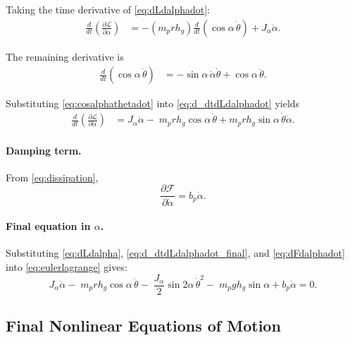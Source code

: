 \documentclass[12pt,a4paper]{article}
\begin{document}
Taking the time derivative of \eqref{eq:dLdalphadot}:
\begin{align}
\frac{d}{dt}\left(\frac{\partial\mathcal{L}}{\partial\dot\alpha}\right)
&=
-\left(m_p r h_g\right)\frac{d}{dt}\left(\cos\alpha\,\dot\theta\right)
+J_\alpha\ddot\alpha.
\label{eq:d_dtdLdalphadot}
\end{align}

The remaining derivative is
\begin{align}
\frac{d}{dt}\left(\cos\alpha\,\dot\theta\right)
&=
-\sin\alpha\,\dot\alpha\dot\theta+\cos\alpha\,\ddot\theta.
\label{eq:cosalphathetadot}
\end{align}

Substituting \eqref{eq:cosalphathetadot} into \eqref{eq:d_dtdLdalphadot} yields
\begin{align}
\frac{d}{dt}\left(\frac{\partial\mathcal{L}}{\partial\dot\alpha}\right)
&=
J_\alpha\ddot\alpha
-\;m_p r h_g\cos\alpha\,\ddot\theta
+m_p r h_g\sin\alpha\,\dot\theta\dot\alpha.
\label{eq:d_dtdLdalphadot_final}
\end{align}

\paragraph{Damping term.}

From \eqref{eq:dissipation},
\begin{equation}
\frac{\partial\mathcal{F}}{\partial\dot\alpha}=b_p\dot\alpha.
\label{eq:dFdalphadot}
\end{equation}

\paragraph{Final equation in $\alpha$.}

Substituting \eqref{eq:dLdalpha}, \eqref{eq:d_dtdLdalphadot_final}, and \eqref{eq:dFdalphadot} into \eqref{eq:eulerlagrange} gives:
\begin{equation}
\boxed{
J_\alpha\ddot\alpha
-\;m_p r h_g\cos\alpha\,\ddot\theta
-\;\frac{J_\alpha}{2}\sin 2\alpha\,\dot\theta^2
-\;m_p g h_g\sin\alpha
+b_p\dot\alpha
=
0.
}
\label{eq:lagrangianalpha}
\end{equation}

\subsection{Final Nonlinear Equations of Motion}
\end{document}
